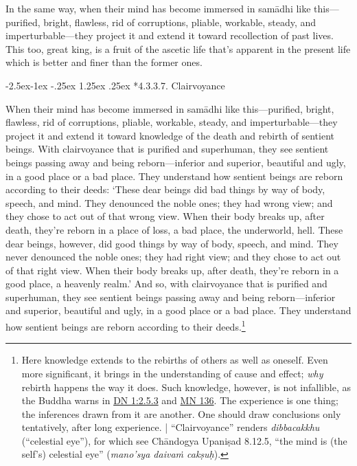 \documentclass[12pt,openany]{book}%
\makeatletter
\renewcommand\paragraph{\@startsection{paragraph}{4}{\z@}%
            {-2.5ex\@plus -1ex \@minus -.25ex}%
            {1.25ex \@plus .25ex}%
            {\noindent\normalfont\itshape\small}}
\makeatother
\begin{document}
In the same way, when their mind has become immersed in \textsanskrit{samādhi} like this—purified, bright, flawless, rid of corruptions, pliable, workable, steady, and imperturbable—they project it and extend it toward recollection of past lives. This too, great king, is a fruit of the ascetic life that’s apparent in the present life which is better and finer than the former ones. 

\paragraph*{4.3.3.7. Clairvoyance }

When their mind has become immersed in \textsanskrit{samādhi} like this—purified, bright, flawless, rid of corruptions, pliable, workable, steady, and imperturbable—they project it and extend it toward knowledge of the death and rebirth of sentient beings. With clairvoyance that is purified and superhuman, they see sentient beings passing away and being reborn—inferior and superior, beautiful and ugly, in a good place or a bad place. They understand how sentient beings are reborn according to their deeds: ‘These dear beings did bad things by way of body, speech, and mind. They denounced the noble ones; they had wrong view; and they chose to act out of that wrong view. When their body breaks up, after death, they’re reborn in a place of loss, a bad place, the underworld, hell. These dear beings, however, did good things by way of body, speech, and mind. They never denounced the noble ones; they had right view; and they chose to act out of that right view. When their body breaks up, after death, they’re reborn in a good place, a heavenly realm.’ And so, with clairvoyance that is purified and superhuman, they see sentient beings passing away and being reborn—inferior and superior, beautiful and ugly, in a good place or a bad place. They understand how sentient beings are reborn according to their deeds.\footnote{Here knowledge extends to the rebirths of others as well as oneself. Even more significant, it brings in the understanding of cause and effect; \emph{why} rebirth happens the way it does. Such knowledge, however, is not infallible, as the Buddha warns in \href{https://suttacentral.net/dn1/en/sujato\#2.5.3}{DN 1:2.5.3} and \href{https://suttacentral.net/mn136/en/sujato}{MN 136}. The experience is one thing; the inferences drawn from it are another. One should draw conclusions only tentatively, after long experience. | “Clairvoyance” renders \textit{dibbacakkhu} (“celestial eye”), for which see \textsanskrit{Chāndogya} \textsanskrit{Upaniṣad} 8.12.5, “the mind is (the self’s) celestial eye” (\textit{mano’sya \textsanskrit{daivaṁ} \textsanskrit{cakṣuḥ}}). } 
\end{document}
